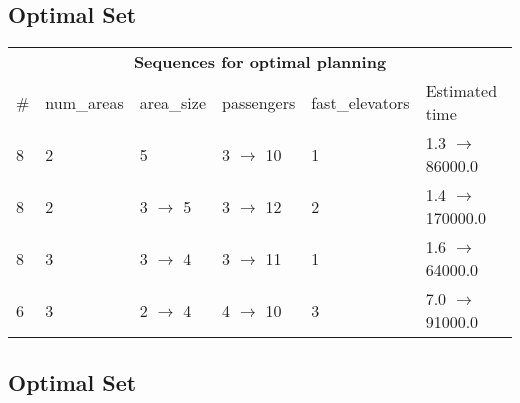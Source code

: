 \documentclass{article}
\begin{document}
                            \subsection*{Optimal Set}

                            \begin{center}
                            \begin{tabular}{l|l|l|l|l|l}
                            \multicolumn{6}{c}{\bf \large Sequences for optimal planning}\\
                            \# & num\_areas & area\_size & passengers & fast\_elevators & Estimated time\\\midrule
                            8&2&5&3 $\rightarrow$ 10&1&1.3 $\rightarrow$ 86000.0\\
8&2&3 $\rightarrow$ 5&3 $\rightarrow$ 12&2&1.4 $\rightarrow$ 170000.0\\
8&3&3 $\rightarrow$ 4&3 $\rightarrow$ 11&1&1.6 $\rightarrow$ 64000.0\\
6&3&2 $\rightarrow$ 4&4 $\rightarrow$ 10&3&7.0 $\rightarrow$ 91000.0
                            \end{tabular}
                            \end{center}
                    
                                \subsection*{Optimal Set}
                                
\end{document}
